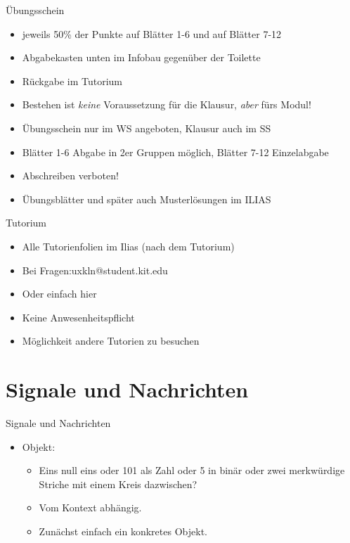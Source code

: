 \documentclass{beamer}
\begin{document}
\begin{frame}{Übungsschein}
	\begin{itemize}
		 
		\item jeweils 50\% der Punkte auf Blätter 1-6 und auf Blätter 7-12
		\item Abgabekasten unten im Infobau gegenüber der Toilette
		\item Rückgabe im Tutorium 
		\item Bestehen ist \emph{keine} Voraussetzung für die Klausur, \emph{aber} fürs Modul! 
		\item Übungsschein nur im WS angeboten, Klausur auch im SS
		\item Blätter 1-6 Abgabe in 2er Gruppen möglich, Blätter 7-12 Einzelabgabe
		\item Abschreiben verboten!
		\item Übungsblätter und später auch Musterlösungen im ILIAS
	\end{itemize}
\end{frame}

\begin{frame}{Tutorium}
	\begin{itemize}
		\item Alle Tutorienfolien im Ilias (nach dem Tutorium)
	\end{itemize}
	 
	
	\begin{itemize}
		\item Bei Fragen:uxkln@student.kit.edu 
		\item Oder einfach hier
		\item Keine Anwesenheitspflicht 
		\item Möglichkeit andere Tutorien zu besuchen
	\end{itemize}
\end{frame}


\section{Signale und Nachrichten}

\begin{frame}{Signale und Nachrichten}
	\begin{itemize}
		 \item Objekt: 
		\begin{itemize}
			 \item Eins null eins oder 101 als Zahl oder 5 in binär oder zwei merkwürdige Striche mit einem Kreis dazwischen?
			 \item Vom Kontext abhängig.
			 \item Zunächst einfach ein konkretes Objekt.
		\end{itemize}
	\end{itemize}
\end{frame}
\end{document}
